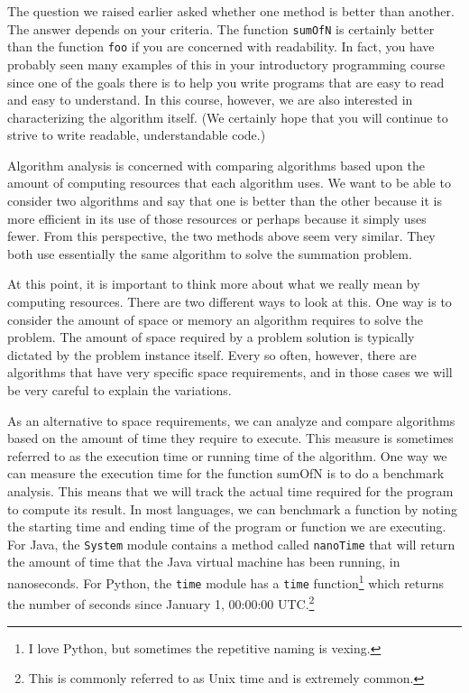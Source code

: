 The question we raised earlier asked whether one method is better than another. The answer depends on your criteria. The function \texttt{sumOfN} is certainly better than the function \texttt{foo} if you are concerned with readability. 
In fact, you have probably seen many examples of this in your introductory programming course since one of the goals there is to help you write programs that are easy to read and easy to understand. 
In this course, however, we are also interested in characterizing the algorithm itself. (We certainly hope that you will continue to strive to write readable, understandable code.)

Algorithm analysis is concerned with comparing algorithms based upon the amount of computing resources that each algorithm uses. 
We want to be able to consider two algorithms and say that one is better than the other because it is more efficient in its use of those resources or perhaps because it simply uses fewer. From this perspective, the two methods above seem very similar. They both use essentially the same algorithm to solve the summation problem.

At this point, it is important to think more about what we really mean by computing resources. There are two different ways to look at this. One way is to consider the amount of space or memory an algorithm requires to solve the problem. The amount of space required by a problem solution is typically dictated by the problem instance itself. Every so often, however, there are algorithms that have very specific space requirements, and in those cases we will be very careful to explain the variations.

As an alternative to space requirements, we can analyze and compare algorithms based on the amount of time they require to execute. This measure is sometimes referred to as the execution time or running time of the algorithm. One way we can measure the execution time for the function sumOfN is to do a benchmark analysis. This means that we will track the actual time required for the program to compute its result. 
In most languages, we can benchmark a function by noting the starting time and ending time of the program or function we are executing. 
For Java, the \texttt{System} module contains a method called \texttt{nanoTime} that will return the amount of time that the Java virtual machine has been running, in nanoseconds. 
For Python, the \texttt{time} module has a \texttt{time} function\footnote{I love Python, but sometimes the repetitive naming is vexing.} which returns the number of seconds since January 1, 00:00:00 UTC.\footnote{This is commonly  referred to as Unix time and is extremely common.}

